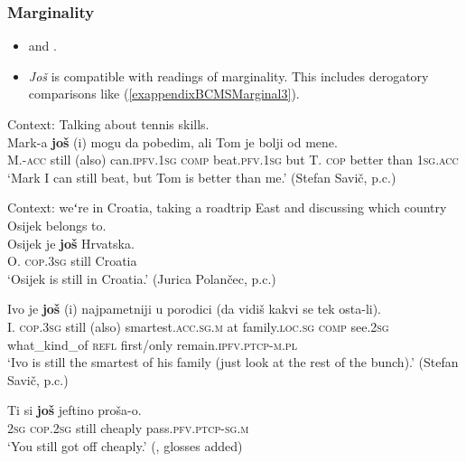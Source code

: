\subsubsection{Marginality}
\label{appendixBCMSMarginal}
\begin{itemize}
	\item \textcite[s.v. \textit{još}]{HJP} and \textcite{Prajnkovic2018}.
	\item \textit{Još} is compatible with readings of marginality.  This includes derogatory comparisons like (\ref{exappendixBCMSMarginal3}).
\end{itemize}
\begin{exe}
	\ex\label{exappendixBCMSMarginal1}
	Context: Talking about tennis skills.\\
	\gll Mark-a \textbf{još} \textup{(}i\textup{)}  mogu da pobedim, ali Tom je bolji od mene.\\
	M.-\textsc{acc} still (also) can.\textsc{ipfv}.1\textsc{sg} \textsc{comp} beat.\textsc{pfv}.1\textsc{sg} but T. \textsc{cop} better than 1\textsc{sg}.\textsc{acc}\\
	\glt \lq Mark I can still beat, but Tom is better than me.' (Stefan Savič, p.c.)
	
		\ex Context: weʻre in Croatia, taking a roadtrip East and discussing which country Osijek belongs to.	\label{exappendixBCMSMarginal2}\\
	\gll Osijek je \textbf{još} Hrvatska.\\
	O. \textsc{cop}.3\textsc{sg} still Croatia\\
	\glt \lq Osijek is still in Croatia.' (Jurica Polančec, p.c.) 

	\ex\label{exappendixBCMSMarginal3}
	\gll Ivo je \textbf{još} \textup{(}i\textup{)} najpametniji u porodici (da vidiš kakvi se tek osta-li).\\
	I. \textsc{cop}.3\textsc{sg} still (also) smartest.\textsc{acc}.\textsc{sg}.\textsc{m} at family.\textsc{loc}.\textsc{sg} \textsc{comp} see.2\textsc{sg} what\_kind\_of \textsc{refl} first/only remain.\textsc{ipfv}.\textsc{ptcp}-\textsc{m}.\textsc{pl}\\
	\glt \lq Ivo is still the smartest of his family (just look at the rest of the bunch).' (Stefan Savič, p.c.)
	
	\ex
	\gll Ti si \textbf{još} jeftino proša-o.\\
	2\textsc{sg} \textsc{cop}.2\textsc{sg} still cheaply pass.\textsc{pfv}.\textsc{ptcp}-\textsc{sg}.\textsc{m}\\
	\glt \lq You still got off cheaply.\rq{ }(\cite[72]{Prajnkovic2018}, glosses added)

\end{exe}

